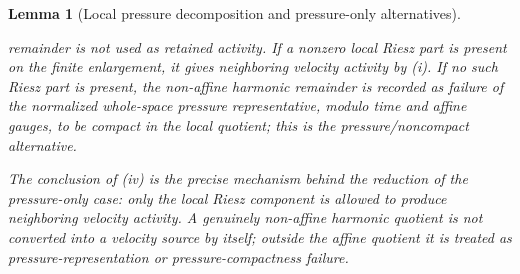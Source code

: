 \documentclass[11pt]{amsart}
\numberwithin{equation}{section}
\theoremstyle{plain}
\newtheorem{lemma}[lemma]{Lemma}
\theoremstyle{definition}
\theoremstyle{remark}
\begin{document}
\begin{lemma}[Local pressure decomposition and pressure-only alternatives]
\begin{enumerate}[label=\textup{(\roman*)}]
   remainder is not used as retained activity.  If a nonzero local Riesz part
   is present on the finite enlargement, it gives neighboring velocity
   activity by \textup{(i)}.  If no such Riesz part is present, the
   non-affine harmonic remainder is recorded as failure of the normalized
   whole-space pressure representative, modulo time and affine gauges, to be
   compact in the local quotient; this is the pressure/noncompact alternative.
\end{enumerate}
The conclusion of \textup{(iv)} is the precise mechanism behind the reduction
of the pressure-only case: only the local Riesz component is allowed to produce
neighboring velocity activity.  A genuinely non-affine harmonic quotient is
not converted into a velocity source by itself; outside the affine quotient it
is treated as pressure-representation or pressure-compactness failure.
\end{lemma}
\end{document}
